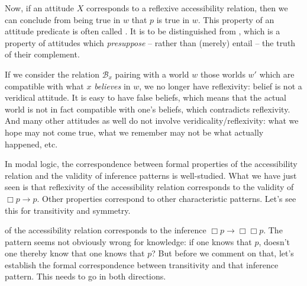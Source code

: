 \clearpage
Now, if an attitude $X$ corresponds to a reflexive accessibility relation, then
we can conclude from  being true in $w$ that $p$
is true in $w$. %
%
This property of an attitude predicate is often called . It
is to be distinguished from , which is a property of attitudes
which \emph{presuppose} -- rather than (merely) entail -- the truth of their
complement.

If we consider the relation $\mathcal{B}_{x}$ pairing with a world
$w$ those worlds $w'$ which are compatible with what $x$ \emph{believes} in $w$,
we no longer have reflexivity: belief is not a veridical attitude. %
%
It is easy to have false beliefs, which means that the actual world is not in
fact compatible with one's beliefs, which contradicts reflexivity. And many
other attitudes as well do not involve veridicality/reflexivity: what we hope
may not come true, what we remember may not be what actually happened, etc.

In modal logic, the correspondence between formal properties of the
accessibility relation and the validity of inference patterns is well-studied.
What we have just seen is that reflexivity of the accessibility relation
corresponds to the validity of $\Box p \rightarrow p$. Other properties
correspond to other characteristic patterns. Let's see this for transitivity and
symmetry.

%
 of the accessibility relation corresponds to the inference
$\Box p \rightarrow \Box \Box p$. The pattern seems not obviously wrong
for knowledge: if one knows that $p$, doesn't one thereby know that one knows
that $p$? But before we comment on that, let's establish the formal
correspondence between transitivity and that inference pattern. This needs to go
in both directions.
  
